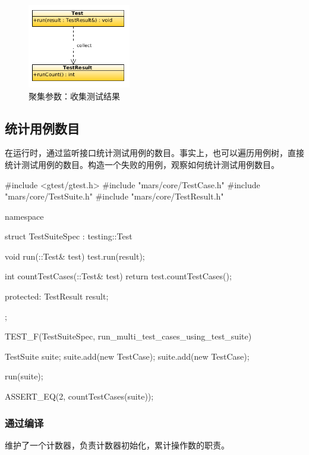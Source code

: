 \begin{content}
\begin{figure}[H]
\centering
\includegraphics[width=0.4\textwidth]{figures/xunit/test-result.png}
\caption{聚集参数：收集测试结果}
 \label{fig:test-tree}
\end{figure}

\subsection{统计用例数目}

在运行时，通过监听接口统计测试用例的数目。事实上，也可以遍历用例树，直接统计测试用例的数目。构造一个失败的用例，观察如何统计测试用例数目。

\begin{leftbar}
 \begin{c++}[caption={\ttfamily{test/mars/core/TestSuiteSpec.cc}}]
#include <gtest/gtest.h>
#include "mars/core/TestCase.h"
#include "mars/core/TestSuite.h"
#include "mars/core/TestResult.h"

namespace {
  struct TestSuiteSpec : testing::Test {
    void run(::Test& test) {
      test.run(result);
    }

    int countTestCases(::Test& test) {
      return test.countTestCases();
    }

  protected:
    TestResult result;
  };
}

TEST_F(TestSuiteSpec, run_multi_test_cases_using_test_suite) {
  TestSuite suite;
  suite.add(new TestCase);
  suite.add(new TestCase);

  run(suite);

  ASSERT_EQ(2, countTestCases(suite));
}
 \end{c++}
\end{leftbar}

\subsubsection{通过编译}

维护了一个计数器，负责计数器初始化，累计操作数的职责。


\end{content}
